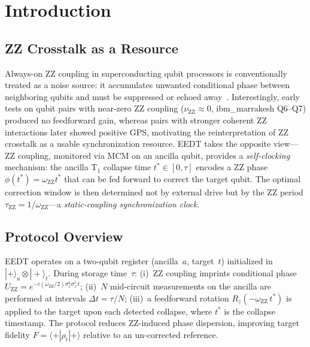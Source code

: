 \documentclass[10pt,twocolumn]{article}
\newcommand{\nuZZ}{\nu_{\mathrm{ZZ}}}
\newcommand{\oZZ}{\omega_{\mathrm{ZZ}}}
\begin{document}
\section{Introduction}
\label{sec:intro}

\subsection{ZZ Crosstalk as a Resource}

Always-on ZZ coupling in superconducting qubit processors is
conventionally treated as a noise source: it accumulates unwanted
conditional phase between neighboring qubits and must be suppressed
or echoed away~\cite{Mundada2019,Krantz2019}.
Interestingly, early tests on qubit pairs with near-zero ZZ coupling
($\nuZZ \approx 0$, ibm\_marrakesh Q6--Q7) produced no feedforward gain,
whereas pairs with stronger coherent ZZ interactions later showed
positive GPS, motivating the reinterpretation of ZZ crosstalk as a
usable synchronization resource.
EEDT takes the opposite view---ZZ coupling, monitored via MCM on an
ancilla qubit, provides a \emph{self-clocking} mechanism:
the ancilla T$_1$ collapse time $t^* \in [0,\tau]$ encodes a ZZ phase
$\phi(t^*) = \oZZ t^*$ that can be fed forward to correct the target qubit.
The optimal correction window is then determined not by external drive
but by the ZZ period $\tau_\mathrm{ZZ} = 1/\oZZ$---a
\emph{static-coupling synchronization clock}.

\subsection{Protocol Overview}

EEDT operates on a two-qubit register (ancilla~$a$, target~$t$) initialized
in $|{+}\rangle_a \otimes |{+}\rangle_t$.
During storage time~$\tau$:
(i)~ZZ coupling imprints conditional phase
$U_{\mathrm{ZZ}} = e^{-i(\oZZ/2)\sigma_z^a\sigma_z^t\,t}$;
(ii)~$N$ mid-circuit measurements on the ancilla are performed at
intervals $\Delta t = \tau / N$;
(iii)~a feedforward rotation $R_z(-\oZZ\,t^*)$ is applied to the target upon
each detected collapse, where $t^*$ is the collapse timestamp.
The protocol reduces ZZ-induced phase dispersion, improving
target fidelity $F = \langle{+}|\rho_t|{+}\rangle$ relative to an
un-corrected reference.
\end{document}
